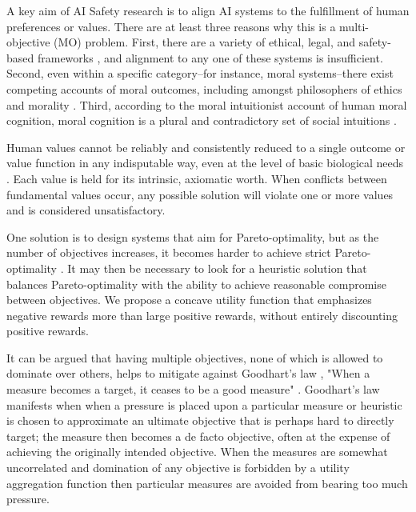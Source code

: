

A key aim of AI Safety research is to align AI systems to the fulfillment of human preferences \cite{Bostrom2014, russell2019human} or values. There are at least three reasons why this is a multi-objective (MO) problem. First, there are a variety of ethical, legal, and safety-based frameworks \cite{vamplew_human-aligned_2018}, and alignment to any one of these systems is insufficient. Second, even within a specific category--for instance, moral systems--there exist competing accounts of moral outcomes, including amongst philosophers of ethics and morality \cite{bogosian_implementation_2017}. Third, according to the moral intuitionist account of human moral cognition, moral cognition is a plural and contradictory set of social intuitions \cite{haidt2001emotional,sotala2016defining}.

Human values cannot be reliably and consistently reduced to a single outcome or value function in any indisputable way, even at the level of basic biological needs \cite{smith2021multiattributemodel}. Each value is held for its intrinsic, axiomatic worth. When conflicts between fundamental values occur, any possible solution will violate one or more values and is considered unsatisfactory.  

One solution is to design systems that aim for Pareto-optimality, but as the number of objectives increases, it becomes harder to achieve strict Pareto-optimality \cite{rolf_need_2020}. It may then be necessary to look for a heuristic solution that balances Pareto-optimality with the ability to achieve reasonable compromise between objectives. We propose a concave utility function that emphasizes negative rewards more than large positive rewards, without entirely discounting positive rewards. %

It can be argued that having multiple objectives, none of which is allowed to dominate over others, helps to mitigate against Goodhart's law \cite{garrabrant_2017}, "When a measure becomes a target, it ceases to be a good measure" \cite{strathern1997improving}. Goodhart's law manifests when when a pressure is placed upon a particular measure or heuristic is chosen to approximate an ultimate objective that is perhaps hard to directly target; the measure then becomes a de facto objective, often at the expense of achieving the originally intended objective. When the measures are somewhat uncorrelated and domination of any objective is forbidden by a utility aggregation function then particular measures are avoided from bearing too much pressure.

